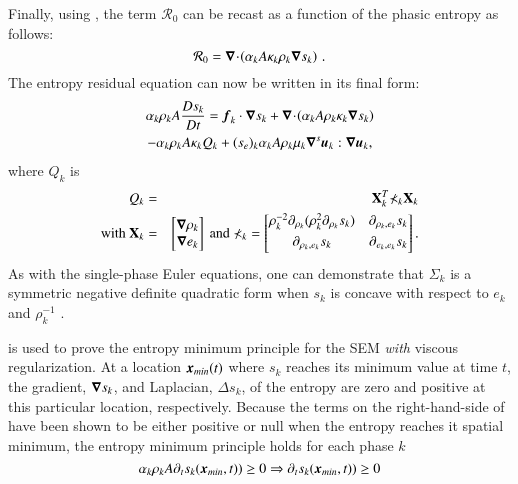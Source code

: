 \documentclass[preprint,10pt]{elsarticle}
\begin{document}
Finally, using , the term $\mathcal{R}_0$ can be recast as a function of the phasic entropy as follows: 
%
\begin{equation}
\mathcal{R}_0 = \boldsymbol\nabla\! \cdot \! \left( \alpha_k A \kappa_k \rho_k \boldsymbol\nabla s_k \right) \,.
\end{equation}
%
The entropy residual equation can now be written in its final form:
%
\begin{multline}\label{eq:ent-res-7-eqn-diss-terms3}
\alpha_k \rho_k A \frac{Ds_k}{Dt} =  \boldsymbol f_k \cdot \boldsymbol\nabla s_k + \boldsymbol\nabla\! \cdot \! \left( \alpha_k A \rho_k \kappa_k  \boldsymbol\nabla s_k \right)  \\
- \alpha_k \rho_k A \kappa_k Q_k + (s_e)_k \alpha_k A \rho_k \mu_k \boldsymbol\nabla^s \boldsymbol u_k : \boldsymbol\nabla \boldsymbol u_k,
\end{multline}
%
where $Q_k$ is 
%
\begin{eqnarray}
Q_k &=& \mathbf{X}^T_k \mathbb{\Sigma}_k \mathbf{X}_k \nonumber \\
\text{with } \mathbf{X}_k &=& \begin{bmatrix}
\boldsymbol\nabla \rho_k \\
\boldsymbol\nabla e_k 
\end{bmatrix}
\text{ and } \mathbb{\Sigma}_k = \begin{bmatrix}
       \rho_k^{-2} \partial_{\rho_k} (\rho^2_k \partial_{\rho_k} s_k) & \partial_{\rho_k,e_k} s_k  \\[0.3em]
       \partial_{\rho_k,e_k} s_k & \partial_{e_k,e_k} s_k           \\[0.3em]
     \end{bmatrix}. \nonumber 
\end{eqnarray}
%
As with the single-phase Euler equations, one can demonstrate that $\mathbb{\Sigma}_k$ is a symmetric negative definite quadratic form 
when $s_k$ is concave with respect to $e_k$ and $\rho_k^{-1}$  \cite{jlg, Marco_paper_low_mach}.

 is used to prove the entropy minimum principle for the SEM \emph{with} viscous regularization. At a location $\boldsymbol x_{min}(t)$ where $s_k$ reaches its minimum value at time $t$, the gradient, $\boldsymbol\nabla s_k$, and Laplacian, $\Delta s_k$,  of the entropy are zero and positive at this particular location, respectively. %
Because the terms on the right-hand-side of  have been shown to be either positive or null when the entropy reaches it spatial minimum, the entropy minimum principle holds for each phase $k$
%
\begin{equation}\label{eq:ent-res-7-eqn-diss-terms4}
\alpha_k \rho_k A \partial_t s_k(\boldsymbol x_{min},t)) \geq 0 \Rightarrow \partial_t s_k(\boldsymbol x_{min},t)) \geq 0 \nonumber
\end{equation}
%
 
\end{document}
